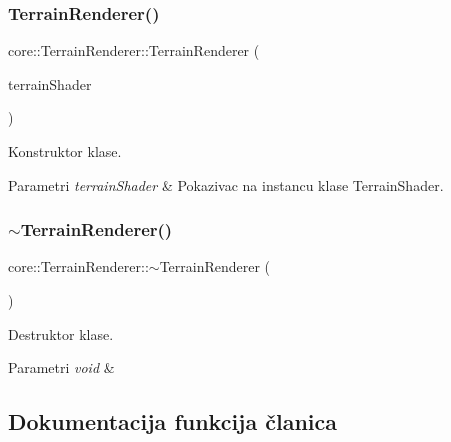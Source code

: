 \subsubsection{\texorpdfstring{Terrain\+Renderer()}{TerrainRenderer()}}
{\footnotesize\ttfamily core\+::\+Terrain\+Renderer\+::\+Terrain\+Renderer (\begin{DoxyParamCaption}\item[{\hyperlink{classshader_1_1TerrainShader}{Terrain\+Shader} $\ast$}]{terrain\+Shader }\end{DoxyParamCaption})}



Konstruktor klase. 


\begin{DoxyParams}{Parametri}
{\em terrain\+Shader} & Pokazivac na instancu klase Terrain\+Shader. \\
\hline
\end{DoxyParams}
\mbox{\label{classcore_1_1TerrainRenderer_a18e79e2c14c4f2196d410bbde7b85060}} 
\subsubsection{\texorpdfstring{$\sim$\+Terrain\+Renderer()}{~TerrainRenderer()}}
{\footnotesize\ttfamily core\+::\+Terrain\+Renderer\+::$\sim$\+Terrain\+Renderer (\begin{DoxyParamCaption}{ }\end{DoxyParamCaption})}



Destruktor klase. 


\begin{DoxyParams}{Parametri}
{\em void} & \\
\hline
\end{DoxyParams}


\subsection{Dokumentacija funkcija članica}
\mbox{\label{classcore_1_1TerrainRenderer_ac66bf45a30d7c1b443f8b77132112fe0}} 
